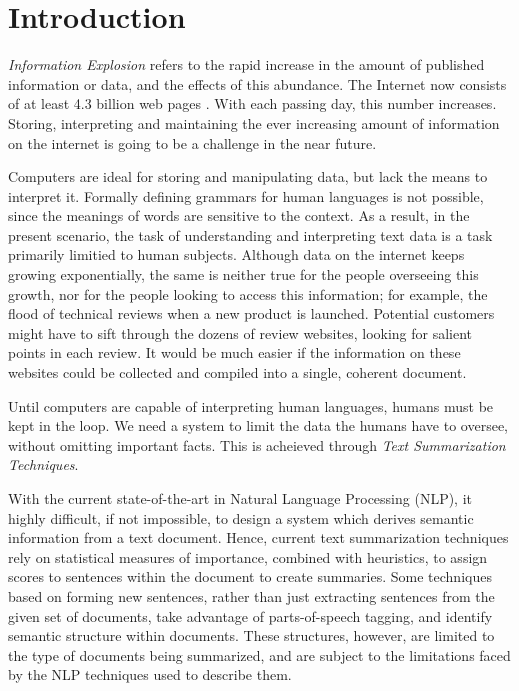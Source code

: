 \documentclass[BTech]{nitgoathesis}
\begin{document}





\chapter{Introduction}
\emph{Information Explosion} \cite{fshock} refers to the rapid increase in the amount of published information or data, and the effects of this abundance. The Internet now consists of at least 4.3 billion web pages \cite{websize}. With each passing day, this number increases. Storing, interpreting and maintaining the ever increasing amount of information on the internet is going to be a challenge in the near future.
\par
Computers are ideal for storing and manipulating data, but lack the means to interpret it. Formally defining grammars for human languages is not possible, since the meanings of words are sensitive to the context. As a result, in the present scenario, the task of understanding and interpreting text data is a task primarily limitied to human subjects. Although data on the internet keeps growing exponentially, the same is neither true for the people overseeing this growth, nor for the people looking to access this information; for example, the flood of technical reviews when a new product is launched. Potential customers might have to sift through the dozens of review websites, looking for salient points in each review. It would be much easier if the information on these websites could be collected and compiled into a single, coherent document.
\par
Until computers are capable of interpreting human languages, humans must be kept in the loop. We need a system to limit the data the humans have to oversee, without omitting important facts. This is acheieved through \emph{Text Summarization Techniques}.
\par

With the current state-of-the-art in Natural Language Processing (NLP), it highly difficult, if not impossible, to design a system which derives semantic information from a text document. Hence, current text summarization techniques rely on statistical measures of importance, combined with heuristics, to assign scores to sentences within the document to create summaries. Some techniques based on forming new sentences, rather than just extracting sentences from the given set of documents, take advantage of parts-of-speech tagging, and identify semantic structure within documents. These structures, however, are limited to the type of documents being summarized, and are subject to the limitations faced by the NLP techniques used to describe them.
\par
\end{document}
